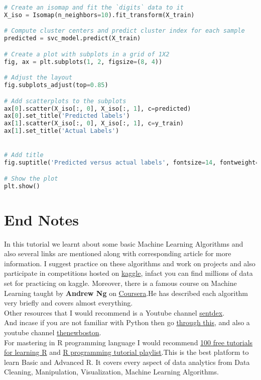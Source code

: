 \documentclass[Proceedings]{ascelike}
\begin{document}
{\begin{lstlisting}[language=Python]
# Create an isomap and fit the `digits` data to it
X_iso = Isomap(n_neighbors=10).fit_transform(X_train)

# Compute cluster centers and predict cluster index for each sample
predicted = svc_model.predict(X_train)

# Create a plot with subplots in a grid of 1X2
fig, ax = plt.subplots(1, 2, figsize=(8, 4))

# Adjust the layout
fig.subplots_adjust(top=0.85)

# Add scatterplots to the subplots
ax[0].scatter(X_iso[:, 0], X_iso[:, 1], c=predicted)
ax[0].set_title('Predicted labels')
ax[1].scatter(X_iso[:, 0], X_iso[:, 1], c=y_train)
ax[1].set_title('Actual Labels')


# Add title
fig.suptitle('Predicted versus actual labels', fontsize=14, fontweight='bold')

# Show the plot
plt.show()
\end{lstlisting}

\section{End Notes}
In this tutorial we learnt about some basic Machine Learning Algorithms and also several links are mentioned along with corresponding article for more information. I suggest practice on these algorithms and work on projects and also participate in competitions hosted on \href{https://www.kaggle.com/}{kaggle}, infact you can find millions of data set for practicing on kaggle. Moreover, there is a famous course on Machine Learning taught by \textbf{Andrew Ng} on \href{https://www.coursera.org/learn/machine-learning}{Coursera}.He has described each algorithm very briefly and covers almost everything.\\
Other resources that I would recommend is a Youtube channel \href{https://www.youtube.com/user/sentdex}{sentdex}.\\And incase if you are not familiar with Python then go \href{https://www.analyticsvidhya.com/blog/2016/01/complete-tutorial-learn-data-science-python-scratch-2/}{through this}, and also a youtube channel \href{https://www.youtube.com/user/thenewboston}{thenewboston}.\\For mastering in R programming language I would recommend \href{http://www.listendata.com/p/r-programming-tutorials.html}{100 free tutorials for learning R} and \href{https://www.youtube.com/playlist?list=PL6gx4Cwl9DGCzVMGCPi1kwvABu7eWv08P}{R programming tutorial playlist}.This is the best platform to learn Basic and Advanced R. It covers every aspect of data analytics from Data Cleaning, Manipulation, Visualization, Machine Learning Algorithms.\\\\\\

}
\end{document}
